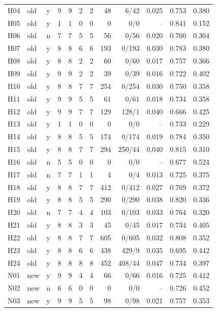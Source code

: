 \documentclass[10pt,a4paper]{article}
\begin{document}
{\begin{longtable}{lllrrrrrrrrr}
H04 & old & y & 9 & 9 & 2 & 2 & 48 & 6/42 & 0.025 & 0.753 & 0.380 \\
H05 & old & y & 1 & 1 & 0 & 0 & 0 & 0/0 & -- & 0.841 & 0.152 \\
H06 & old & n & 7 & 7 & 5 & 5 & 56 & 0/56 & 0.020 & 0.760 & 0.304 \\
H07 & old & y & 8 & 8 & 6 & 6 & 193 & 0/193 & 0.030 & 0.783 & 0.380 \\
H08 & old & y & 8 & 8 & 2 & 2 & 60 & 0/60 & 0.017 & 0.757 & 0.366 \\
H09 & old & y & 9 & 9 & 2 & 2 & 39 & 0/39 & 0.016 & 0.722 & 0.402 \\
H10 & old & y & 8 & 8 & 7 & 7 & 254 & 0/254 & 0.030 & 0.750 & 0.358 \\
H11 & old & y & 9 & 9 & 5 & 5 & 61 & 0/61 & 0.018 & 0.734 & 0.358 \\
H12 & old & y & 9 & 9 & 7 & 7 & 129 & 128/1 & 0.040 & 0.666 & 0.425 \\
H13 & old & y & 1 & 1 & 0 & 0 & 0 & 0/0 & -- & 0.733 & 0.229 \\
H14 & old & y & 8 & 8 & 5 & 5 & 174 & 0/174 & 0.019 & 0.784 & 0.350 \\
H15 & old & y & 8 & 8 & 7 & 7 & 294 & 250/44 & 0.040 & 0.815 & 0.310 \\
H16 & old & n & 5 & 5 & 0 & 0 & 0 & 0/0 & -- & 0.677 & 0.524 \\
H17 & old & n & 7 & 7 & 1 & 1 & 4 & 0/4 & 0.013 & 0.725 & 0.375 \\
H18 & old & y & 8 & 8 & 7 & 7 & 412 & 0/412 & 0.027 & 0.769 & 0.372 \\
H19 & old & y & 8 & 8 & 5 & 5 & 290 & 0/290 & 0.038 & 0.820 & 0.336 \\
H20 & old & n & 7 & 7 & 4 & 4 & 103 & 0/103 & 0.033 & 0.764 & 0.320 \\
H21 & old & y & 8 & 8 & 3 & 3 & 45 & 0/45 & 0.017 & 0.734 & 0.405 \\
H22 & old & y & 8 & 8 & 7 & 7 & 605 & 0/605 & 0.032 & 0.808 & 0.352 \\
H23 & old & y & 8 & 8 & 6 & 6 & 438 & 429/9 & 0.035 & 0.695 & 0.442 \\
H24 & old & y & 8 & 8 & 8 & 8 & 452 & 408/44 & 0.047 & 0.734 & 0.397 \\
N01 & new & y & 9 & 9 & 4 & 4 & 66 & 0/66 & 0.016 & 0.725 & 0.412 \\
N02 & new & n & 6 & 6 & 0 & 0 & 0 & 0/0 & -- & 0.726 & 0.452 \\
N03 & new & y & 9 & 9 & 5 & 5 & 98 & 0/98 & 0.021 & 0.757 & 0.353 \\

\end{longtable}}
\end{document}
